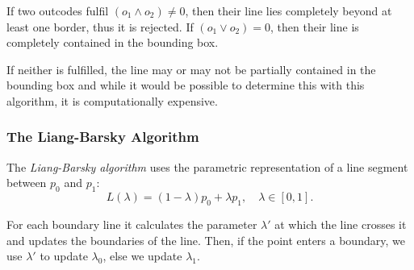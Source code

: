 \documentclass[english]{panikzettel}
\begin{document}
If two outcodes fulfil $(o_1 \land o_2) \neq 0$, then their line lies completely beyond at least one border, thus it is rejected. If $(o_1 \lor o_2) = 0$, then their line is completely contained in the bounding box.

If neither is fulfilled, the line may or may not be partially contained in the bounding box and while it would be possible to determine this with this algorithm, it is computationally expensive.

\subsubsection*{The Liang-Barsky Algorithm}

\begin{halfboxl}
The \emph{Liang-Barsky algorithm} uses the parametric representation of a line segment between $p_0$ and $p_1$: $$L(\lambda) = (1 - \lambda)p_0 + \lambda p_1, \quad \lambda \in [0,1].$$

For each boundary line it calculates the parameter $\lambda'$ at which the line crosses it and updates the boundaries of the line. Then, if the point enters a boundary, we use $\lambda'$ to update $\lambda_0$, else we update $\lambda_1$.
\end{halfboxl}%
\begin{halfboxr}
\vspace{-\baselineskip}
\begin{center}
\end{center}
\end{halfboxr}
\end{document}

